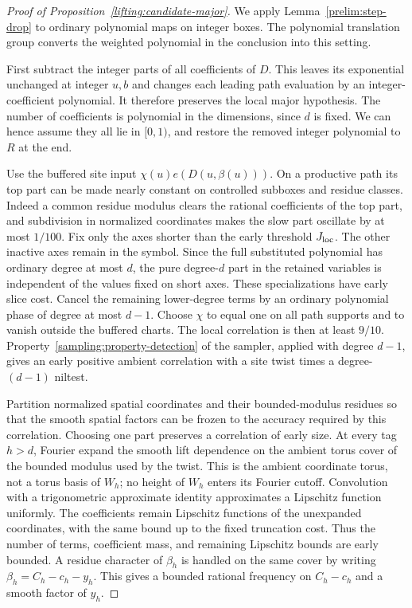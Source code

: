 \begin{proof}[Proof of Proposition~\ref{lifting:candidate-major}]
We apply Lemma~\ref{prelim:step-drop} to ordinary polynomial maps
on integer boxes.  The polynomial translation group converts the
weighted polynomial in the conclusion into this setting.

First subtract the integer parts of all coefficients of $D$.
This leaves its exponential unchanged at integer $u,b$ and changes
each leading path evaluation by an integer-coefficient polynomial.
It therefore preserves the local major hypothesis.  The number of
coefficients is polynomial in the dimensions, since $d$ is fixed.
We can hence assume they all lie in $[0,1)$, and restore the removed
integer polynomial to $R$ at the end.

Use the buffered site input
$\chi(u)e(D(u,\beta(u)))$.  On a productive path its top part can be
made nearly constant on controlled subboxes and residue classes.
Indeed a common residue modulus clears the rational coefficients of
the top part, and subdivision in normalized coordinates makes the
slow part oscillate by at most $1/100$.  Fix only the axes shorter
than the early threshold $J_{\rm loc}$.  The other inactive axes
remain in the symbol.  Since the full substituted polynomial has
ordinary degree at most $d$, the pure degree-$d$ part in the
retained variables is independent of the values fixed on short
axes.  These specializations have early slice cost.  Cancel the
remaining lower-degree terms by an ordinary polynomial phase of
degree at most $d-1$.  Choose $\chi$ to equal one on all path supports and
to vanish outside the buffered charts.  The local correlation is
then at least $9/10$.  Property~\ref{sampling:property-detection} of
the sampler, applied with degree
$d-1$, gives an early positive ambient correlation with a site twist
times a degree-$(d-1)$ niltest.

Partition normalized spatial coordinates and their bounded-modulus
residues so that the smooth spatial factors can be frozen to the
accuracy required by this correlation.  Choosing one part preserves
a correlation of early size.  At every tag $h>d$, Fourier expand the
smooth lift dependence on the ambient torus cover of the bounded
modulus used by the twist.  This is the ambient coordinate torus,
not a torus basis of $W_h$; no height of $W_h$ enters its Fourier
cutoff.  Convolution with a trigonometric approximate identity
approximates a Lipschitz function uniformly.  The coefficients remain
Lipschitz functions of the unexpanded coordinates, with the same
bound up to the fixed truncation cost.  Thus the number of terms,
coefficient mass, and remaining Lipschitz bounds are early bounded.
A residue character of $\beta_h$ is handled on the same cover by
writing $\beta_h=C_h-c_h-y_h$.  This gives a bounded rational
frequency on $C_h-c_h$ and a smooth factor of $y_h$.


\end{proof}
